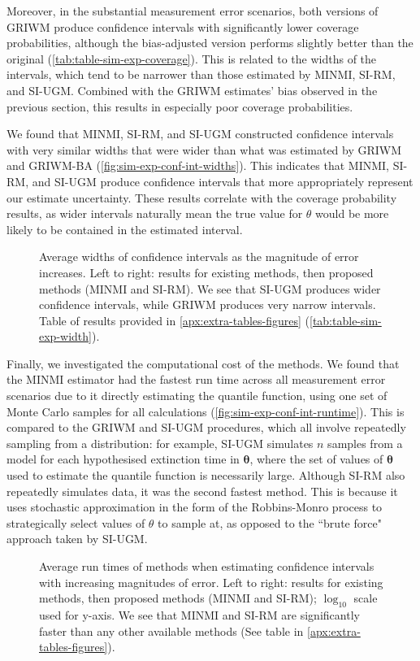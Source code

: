 Moreover, in the substantial measurement error scenarios, both versions of GRIWM produce confidence intervals with significantly lower coverage probabilities, although the bias-adjusted version performs slightly better than the original (\autoref{tab:table-sim-exp-coverage}). This is related to the widths of the intervals, which tend to be narrower than those estimated by MINMI, SI-RM, and SI-UGM. Combined with the GRIWM estimates' bias observed in the previous section, this results in especially poor coverage probabilities.

We found that MINMI, SI-RM, and SI-UGM constructed confidence intervals with very similar widths that were wider than what was estimated by GRIWM and GRIWM-BA (\autoref{fig:sim-exp-conf-int-widths}). This indicates that MINMI, SI-RM, and SI-UGM produce confidence intervals that more appropriately represent our estimate uncertainty. These results correlate with the coverage probability results, as wider intervals naturally mean the true value for $\theta$ would be more likely to be contained in the estimated interval.
\begin{figure}[ht]
    \centering
    
    \caption{Average widths of confidence intervals as the magnitude of error increases. Left to right: results for existing methods, then proposed methods (MINMI and SI-RM). We see that SI-UGM produces wider confidence intervals, while GRIWM produces very narrow intervals. Table of results provided in \autoref{apx:extra-tables-figures} (\autoref{tab:table-sim-exp-width}).}
    \label{fig:sim-exp-conf-int-widths}
\end{figure}

Finally, we investigated the computational cost of the methods. We found that the MINMI estimator had the fastest run time across all measurement error scenarios due to it directly estimating the quantile function, using one set of Monte Carlo samples for all calculations (\autoref{fig:sim-exp-conf-int-runtime}). This is compared to the GRIWM and SI-UGM procedures, which all involve repeatedly sampling from a distribution: for example, SI-UGM simulates $n$ samples from a model for each hypothesised extinction time in $\bm{\theta}$, where the set of values of $\bm{\theta}$ used to estimate the quantile function is necessarily large. Although SI-RM also repeatedly simulates data, it was the second fastest method. This is because it uses stochastic approximation in the form of the Robbins-Monro process to strategically select values of $\theta$ to sample at, as opposed to the ``brute force" approach taken by SI-UGM.
\begin{figure}[ht]
    \centering
    
    \caption{Average run times of methods when estimating confidence intervals with increasing magnitudes of error. Left to right: results for existing methods, then proposed methods (MINMI and SI-RM); $\log_{10}$ scale used for y-axis. We see that MINMI and SI-RM are significantly faster than any other available methods (See table in \autoref{apx:extra-tables-figures}).}
    \label{fig:sim-exp-conf-int-runtime}
\end{figure}